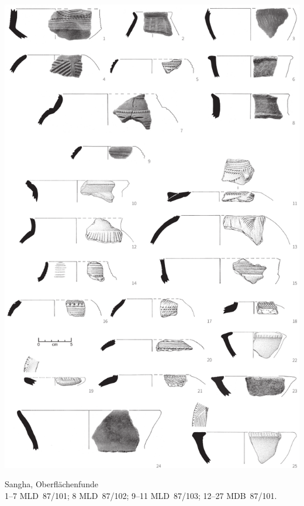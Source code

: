 \begin{pl}[H]
	\includegraphics{plt/Taf57.pdf}
	\vspace{.75em}\caption{\mbox{Sangha}, Oberflächenfunde \\ 1--7 MLD~87/101; 8 MLD~87/102; 9--11 MLD~87/103; 12--27 MDB~87/101.}
	\label{pl:57}
\end{pl}

